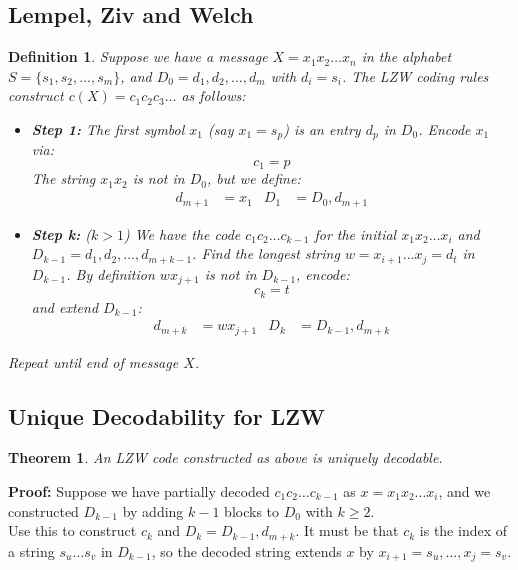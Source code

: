 \documentclass[11pt]{article}
\newtheorem{defn}{Definition}
\newtheorem{theo}{Theorem}
\begin{document}
\subsection{Lempel, Ziv and Welch}
\begin{defn}
  Suppose we have a message $X = x_1 x_2 \ldots x_n$ in the alphabet $S = \{ s_1, s_2, \ldots, s_m \}$, and $D_0 = d_1, d_2, \ldots, d_m$ with $d_i = s_i$.
  The LZW coding rules construct $c(X) = c_1 c_2 c_3 \ldots$ as follows:
  \begin{itemize}
    \item \textbf{Step 1:} The first symbol $x_1$ (say $x_1 = s_p$) is an entry $d_p$ in $D_0$.
      Encode $x_1$ via:
      \[
        c_1 = p
      \]
      The string $x_1 x_2$ is not in $D_0$, but we define:
      \begin{align*}
        d_{m + 1} &= x_1 & D_1 &= D_0, d_{m + 1}
      \end{align*}
    \item \textbf{Step k:} ($k > 1$) We have the code $c_1 c_2 \ldots c_{k - 1}$ for the initial $x_1 x_2 \ldots x_i$ and $D_{k - 1} = d_1, d_2, \ldots, d_{m + k - 1}$.
      Find the longest string $w = x_{i + 1} \ldots x_j = d_t$ in $D_{k - 1}$.
      By definition $wx_{j + 1}$ is not in $D_{k - 1}$, encode:
      \[
        c_k = t
      \]
      and extend $D_{k - 1}$:
      \begin{align*}
        d_{m + k} &= wx_{j + 1} & D_k &= D_{k - 1}, d_{m + k}
      \end{align*}
  \end{itemize}
  Repeat until end of message $X$.
\end{defn}

\subsection{Unique Decodability for LZW}
\begin{theo}
  An LZW code constructed as above is uniquely decodable.
\end{theo}

\textbf{Proof:}
Suppose we have partially decoded $c_1 c_2 \ldots c_{k - 1}$ as $x = x_1 x_2 \ldots x_i$, and we constructed $D_{k - 1}$ by adding $k - 1$ blocks to $D_0$ with $k \geq 2$. \\

Use this to construct $c_k$ and $D_k = D_{k - 1}, d_{m + k}$.
It must be that $c_k$ is the index of a string $s_u \ldots s_v$ in $D_{k - 1}$, so the decoded string extends $x$ by $x_{i + 1} = s_u, \ldots, x_j = s_v$. \\
\end{document}
